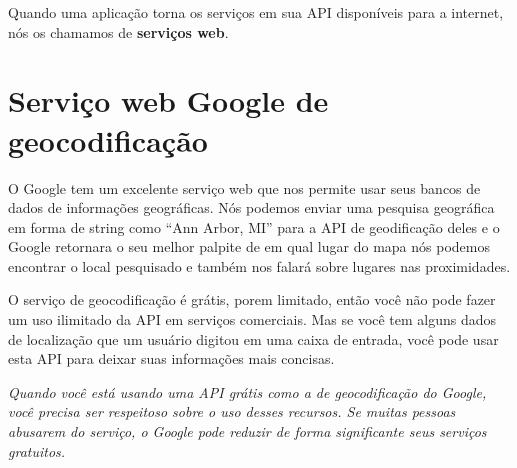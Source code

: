 Quando uma aplicação torna os serviços em sua API disponíveis para a internet,
nós os chamamos de {\bf serviços web}.

\section{Serviço web Google de geocodificação}

O Google tem um excelente serviço web que nos permite usar seus bancos de
dados de informações geográficas. Nós podemos enviar uma pesquisa geográfica 
em forma de string como ``Ann Arbor, MI'' para a API de geodificação deles e o 
Google retornara o seu melhor palpite de em qual lugar do mapa nós podemos 
encontrar o local pesquisado e também nos falará sobre lugares nas proximidades. 


O serviço de geocodificação é grátis, porem limitado, então você não pode fazer
um uso ilimitado da API em serviços comerciais. Mas se você tem alguns dados de
localização que um usuário digitou em uma caixa de entrada, você pode usar
esta API para deixar suas informações mais concisas.

{\em Quando você está usando uma API grátis como a de geocodificação do Google,
você precisa ser respeitoso sobre o uso desses recursos. Se muitas pessoas
abusarem do serviço, o Google pode reduzir de forma significante seus serviços
gratuitos.}

